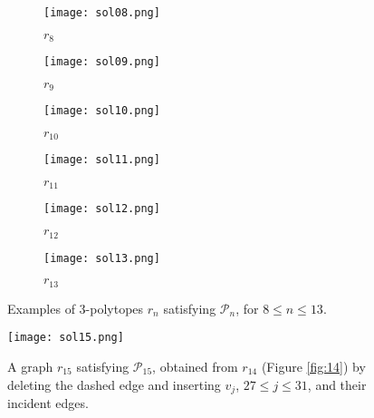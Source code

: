 \documentclass[11pt]{article}
\newlength{\numtwo}
\newlength{\widtwo}
\newlength{\widtwo}
\theoremstyle{definition}
\numberwithin{equation}{section}
\def\calP{\mathcal{P}}
\begin{document}
\begin{figure}[h!]
	\begin{subfigure}{\numtwo}
		\centering
		\texttt{[image: sol08.png]}
		\caption{$r_{8}$}
	\end{subfigure}
	\begin{subfigure}{\numtwo}
		\centering
		\texttt{[image: sol09.png]}
		\caption{$r_{9}$}
	\end{subfigure}
	\begin{subfigure}{\numtwo}
		\centering
		\texttt{[image: sol10.png]}
		\caption{$r_{10}$}
	\end{subfigure}
	\begin{subfigure}{\numtwo}
		\centering
		\texttt{[image: sol11.png]}
		\caption{$r_{11}$}
	\end{subfigure}
	\begin{subfigure}{\numtwo}
		\centering
		\texttt{[image: sol12.png]}
		\caption{$r_{12}$}
	\end{subfigure}
	\begin{subfigure}{\numtwo}
		\centering
		\texttt{[image: sol13.png]}
		\caption{$r_{13}$}
	\end{subfigure}
	\caption{Examples of $3$-polytopes $r_n$ satisfying $\calP_n$, for $8\leq n\leq 13$.}%
\label{fig:8-13}
\end{figure}
\begin{figure}[h!]
	\centering
	\texttt{[image: sol15.png]}
	\caption{A graph $r_{15}$ satisfying $\calP_{15}$, obtained from $r_{14}$ (Figure \ref{fig:14}) by deleting the dashed edge and inserting $v_j$, $27\leq j\leq 31$, and their incident edges.}
	\label{fig:15}
\end{figure}
\end{document}
